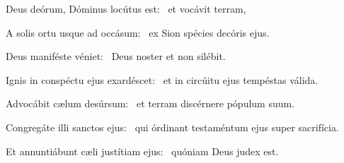 \item Deus deórum, Dóminus locútus est:~\psstar{} et vocávit terram,

\item A solis ortu usque ad occásum:~\psstar{} ex Sion spécies decóris ejus.

\item Deus maniféste véniet:~\psstar{} Deus noster et non silébit.

\item Ignis in conspéctu ejus exardéscet:~\psstar{} et in circúitu ejus tempéstas válida.

\item Advocábit cælum desúrsum:~\psstar{} et terram discérnere pópulum suum.

\item Congregáte illi sanctos ejus:~\psstar{} qui órdinant testaméntum ejus super sacrifícia.

\item Et annuntiábunt cæli justítiam ejus:~\psstar{} quóniam Deus judex est.
